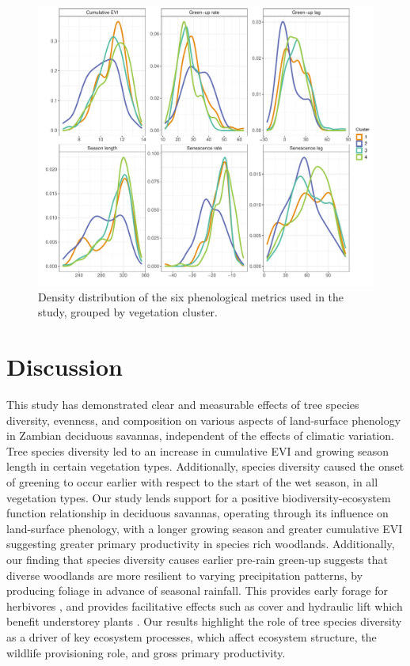 \begin{refsection}
\begin{figure}
	\includegraphics[width=\linewidth]{img/phen_dens_clust}
	\caption[Density distribution of phenological metrics per vegetation type]{Density distribution of the six phenological metrics used in the study, grouped by vegetation cluster.}
	\label{phen:phen_dens_clust}
\end{figure}

\section{Discussion}
\label{phen:sec:discussion}

This study has demonstrated clear and measurable effects of tree species diversity, evenness, and composition on various aspects of land-surface phenology in Zambian deciduous savannas, independent of the effects of climatic variation. Tree species diversity led to an increase in cumulative EVI and growing season length in certain vegetation types. Additionally, species diversity caused the onset of greening to occur earlier with respect to the start of the wet season, in all vegetation types. Our study lends support for a positive biodiversity-ecosystem function relationship in deciduous savannas, operating through its influence on land-surface phenology, with a longer growing season and greater cumulative EVI suggesting greater primary productivity in species rich woodlands. Additionally, our finding that species diversity causes earlier pre-rain green-up suggests that diverse woodlands are more resilient to varying precipitation patterns, by producing foliage in advance of seasonal rainfall. This provides early forage for herbivores \citep{Morellato2016}, and provides facilitative effects such as cover and hydraulic lift which benefit understorey plants \citep{Domec2010, Yu2015}. Our results highlight the role of tree species diversity as a driver of key ecosystem processes, which affect ecosystem structure, the wildlife provisioning role, and gross primary productivity.


\end{refsection}

